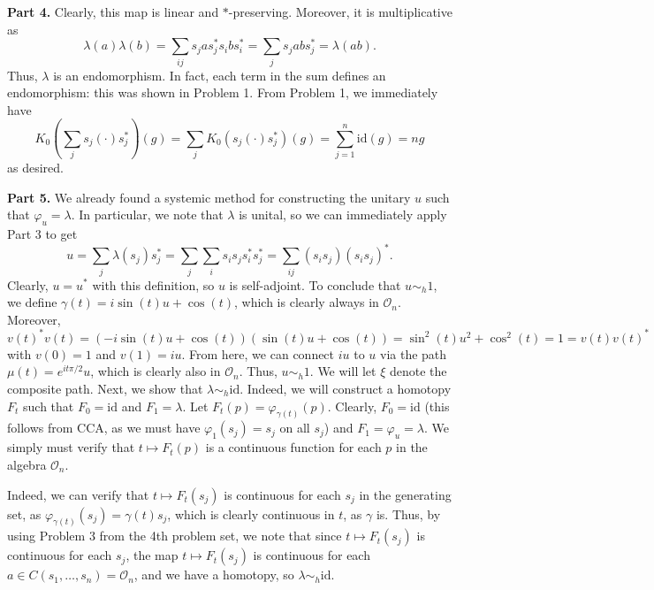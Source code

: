 \documentclass[aps,pra,showpacs,notitlepage,onecolumn,superscriptaddress,nofootinbib]{revtex4-1}
\theoremstyle{definition}
\begin{document}
\noindent \textbf{Part 4.} Clearly, this map is linear and $*$-preserving. Moreover, it is multiplicative as
\begin{equation}
  \lambda(a)\lambda(b) = \sum_{ij} s_j a s_j^{*} s_i b s_i^{*} = \sum_{j} s_j a b s_j^{*} = \lambda(ab).
\end{equation}
Thus, $\lambda$ is an endomorphism. In fact, each term in the sum defines an endomorphism: this was shown in Problem 1. From Problem 1,
we immediately have
\begin{equation}
  K_0 \left( \sum_{j} s_j (\cdot) s_j^{*} \right)(g) = \sum_{j} K_0(s_j (\cdot) s_j^{*})(g) = \sum_{j = 1}^{n} \text{id}(g) = ng
\end{equation}
as desired.
\newline

\noindent \textbf{Part 5.} We already found a systemic method for constructing the unitary $u$ such that $\varphi_u = \lambda$. In particular, we note that
$\lambda$ is unital, so we can immediately apply Part 3 to get
\begin{equation}
  u = \sum_{j} \lambda(s_j) s_j^{*} = \sum_{j} \sum_{i} s_i s_j s_i^{*} s_j^{*} = \sum_{ij} (s_i s_j) (s_i s_j)^{*}.
\end{equation}
Clearly, $u = u^{*}$ with this definition, so $u$ is self-adjoint. To conclude that $u \sim_h 1$, we define $\gamma(t) = i \sin(t) u + \cos(t)$, which is clearly always in $\mathcal{O}_n$. Moreover,
\begin{equation}
  v(t)^{*} v(t) = (-i \sin(t) u + \cos(t)) (\sin(t) u + \cos(t)) = \sin^2(t) u^2 + \cos^2(t) = 1 = v(t) v(t)^{*}
\end{equation}
with $v(0) = 1$ and $v(1) = i u$. From here, we can connect $iu$ to $u$ via the path $\mu(t) = e^{i t \pi/2} u$, which is clearly also in $\mathcal{O}_n$. Thus, $u \sim_h 1$. We will let $\xi$ denote the composite path. Next, we show that $\lambda \sim_h \text{id}$.
Indeed, we will construct a homotopy $F_t$ such that $F_0 = \text{id}$ and $F_1 = \lambda$. Let $F_t(p) = \varphi_{\gamma(t)}(p)$. Clearly, $F_0 = \text{id}$ (this follows from CCA, as we must have $\varphi_1(s_j) = s_j$ on all $s_j$) and $F_1 = \varphi_u = \lambda$.
We simply must verify that $t \mapsto F_t(p)$ is a continuous function for each $p$ in the algebra $\mathcal{O}_n$.

Indeed, we can verify that $t \mapsto F_t(s_j)$ is continuous for each $s_j$ in the generating set, as $\varphi_{\gamma(t)}(s_j) = \gamma(t) s_j$, which is clearly continuous in $t$, as $\gamma$ is. Thus, by using Problem 3 from the 4th problem set, we note
that since $t \mapsto F_t(s_j)$ is continuous for each $s_j$, the map $t \mapsto F_t(s_j)$ is continuous for each $a \in C(s_1, \dots, s_n) = \mathcal{O}_n$, and we have a homotopy, so $\lambda \sim_h \text{id}$.
\newline
\end{document}
